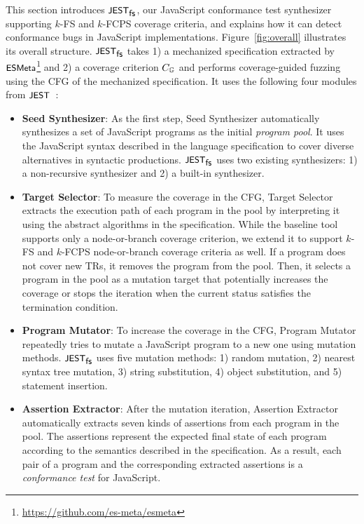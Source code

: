 This section introduces $\textsf{\small JEST}_{\textsf{\small fs}}$, our JavaScript conformance test synthesizer
supporting $k$-FS and $k$-FCPS coverage criteria, and explains how it can detect
conformance bugs in JavaScript implementations.
Figure~\ref{fig:overall} illustrates its overall structure.
$\textsf{\small JEST}_{\textsf{\small fs}}$ takes 1) a mechanized specification extracted by $\textsf{\small ESMeta}$\footnote{
  \url{https://github.com/es-meta/esmeta}
}
and 2) a coverage criterion $C_{\mathbb{G}}$ and performs coverage-guided fuzzing
using the CFG of the mechanized specification. It uses the following four
modules from $\textsf{\small JEST}$~\cite{jest}:
\begin{itemize}
  \item \textsf{\textbf{Seed Synthesizer}}:
    As the first step, \textsf{Seed Synthesizer} automatically synthesizes a set
    of JavaScript programs as the initial \textit{program pool}.
    It uses the JavaScript syntax described in the language specification to
    cover diverse alternatives in syntactic productions.
    $\textsf{\small JEST}_{\textsf{\small fs}}$ uses two existing synthesizers: 1) a non-recursive synthesizer and
    2) a built-in synthesizer.
  \item \textsf{\textbf{Target Selector}}:
    To measure the coverage in the CFG, \textsf{Target Selector} extracts the
    execution path of each program in the pool by interpreting it using the
    abstract algorithms in the specification.
    While the baseline tool supports only a node-or-branch coverage criterion,
    we extend it to support $k$-FS and $k$-FCPS node-or-branch coverage
    criteria as well.
    If a program does not cover new TRs, it removes the program from the pool.
    Then, it selects a program in the pool as a mutation target that potentially
    increases the coverage or stops the iteration when the current status
    satisfies the termination condition.
  \item \textsf{\textbf{Program Mutator}}:
    To increase the coverage in the CFG, \textsf{Program Mutator} repeatedly
    tries to mutate a JavaScript program to a new one using mutation methods.
    $\textsf{\small JEST}_{\textsf{\small fs}}$ uses five mutation methods: 1) random mutation, 2)
    nearest syntax tree mutation, 3) string substitution, 4) object
    substitution, and 5) statement insertion.
  \item \textsf{\textbf{Assertion Extractor}}:
    After the mutation iteration, \textsf{Assertion Extractor} automatically
    extracts seven kinds of assertions from each program in the pool.
    The assertions represent the expected final state of each program according
    to the semantics described in the specification.
    As a result, each pair of a program and the corresponding extracted
    assertions is a \textit{conformance test} for JavaScript.
\end{itemize}

